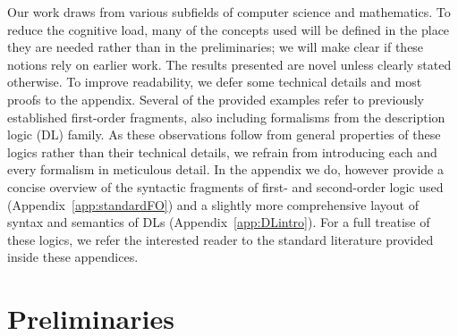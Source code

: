 \documentclass[10pt,a4paper]{amsart}
\theoremstyle{definition}
\numberwithin{equation}{section}
\theoremstyle{plain}
\theoremstyle{definition}
\theoremstyle{myexample}
\theoremstyle{plain}
\theoremstyle{definition}
\renewcommand{\vec}[1]{\boldsymbol{#1}}
\newcommand{\const}[1]{\mathtt{#1}}
\newcommand{\concat}{\mathbin{{+}\hspace{-0.5ex}{+}}}
\begin{document}
Our work draws from various subfields of computer science and mathematics. To reduce the cognitive load, many of the concepts used will be defined in the place they are needed rather than in the preliminaries; we will make clear if these notions rely on earlier work. The results presented are novel unless clearly stated otherwise.
To improve readability, we defer some technical details and most proofs to the appendix.
Several of the provided examples refer to previously established first-order fragments, also including formalisms from the description logic (DL) family. As these observations follow from general properties of these logics rather than their technical details, we refrain from introducing each and every formalism in meticulous detail. In the appendix we do, however provide a concise overview of the syntactic fragments of first- and second-order logic used (Appendix~\ref{app:standardFO}) and a slightly more comprehensive layout of syntax and semantics of DLs (Appendix~\ref{app:DLintro}).   
For a full treatise of these logics, we refer the interested reader to the standard literature provided inside these appendices.

\section{Preliminaries}\label{sec:preliminaries}

\newcommand{\shuffle}[1]{\concat_{#1}}
\end{document}
